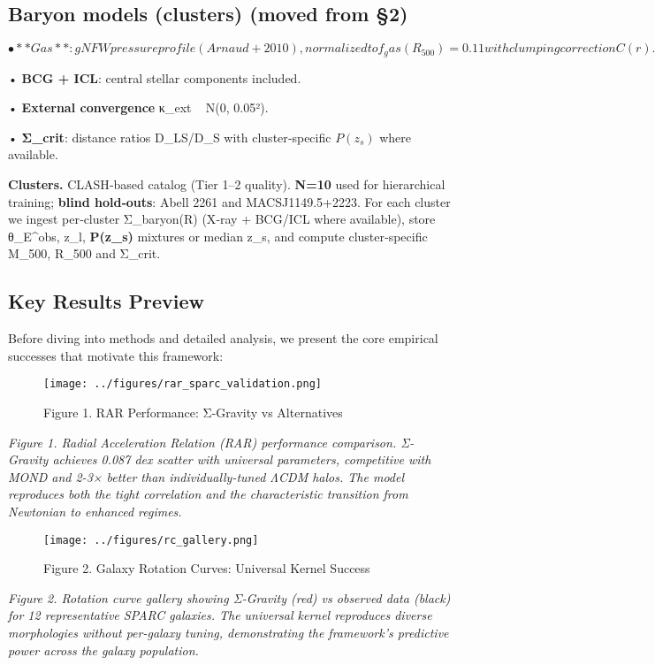 \documentclass[11pt,a4paper]{article}
\begin{document}
\subsection{Baryon models (clusters) (moved from §2)}


\[
• **Gas**: gNFW pressure profile (Arnaud+2010), normalized to f_gas(R_500)=0.11 with clumping correction C(r).
\]

• \textbf{BCG + ICL}: central stellar components included.  

• \textbf{External convergence} κ\_ext ~ N(0, 0.05²).  

• \textbf{Σ\_crit}: distance ratios D\_LS/D\_S with cluster‑specific $P(z_s)$ where available.


\textbf{Clusters.} CLASH‑based catalog (Tier 1–2 quality). \textbf{N=10} used for hierarchical training; \textbf{blind hold‑outs}: Abell 2261 and MACSJ1149.5+2223. For each cluster we ingest per‑cluster Σ\_baryon(R) (X‑ray + BCG/ICL where available), store {θ\_E^obs, z\_l, \textbf{P(z\_s)} mixtures or median z\_s}, and compute cluster‑specific M\_500, R\_500 and Σ\_crit.


\subsection{Key Results Preview}


Before diving into methods and detailed analysis, we present the core empirical successes that motivate this framework:


\begin{figure}[h]
\centering
\texttt{[image: ../figures/rar\_sparc\_validation.png]}
\caption{Figure 1. RAR Performance: Σ-Gravity vs Alternatives}
\end{figure}


\textit{Figure 1. Radial Acceleration Relation (RAR) performance comparison. Σ-Gravity achieves 0.087 dex scatter with universal parameters, competitive with MOND and 2-3× better than individually-tuned ΛCDM halos. The model reproduces both the tight correlation and the characteristic transition from Newtonian to enhanced regimes.}


\begin{figure}[h]
\centering
\texttt{[image: ../figures/rc\_gallery.png]}
\caption{Figure 2. Galaxy Rotation Curves: Universal Kernel Success}
\end{figure}


\textit{Figure 2. Rotation curve gallery showing Σ-Gravity (red) vs observed data (black) for 12 representative SPARC galaxies. The universal kernel reproduces diverse morphologies without per-galaxy tuning, demonstrating the framework's predictive power across the galaxy population.}
\end{document}
